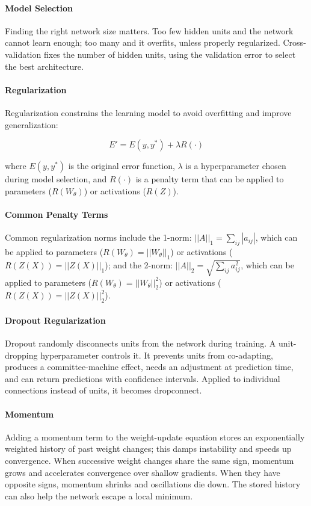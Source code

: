 \paragraph{Model Selection}
Finding the right network size matters. Too few hidden units and the network cannot learn enough; too many and it overfits, unless properly regularized. Cross-validation fixes the number of hidden units, using the validation error to select the best architecture.

\paragraph{Regularization}

Regularization constrains the learning model to avoid overfitting and improve generalization:

\begin{equation}
E' = E(y, y^*) + \lambda R(\cdot)
\end{equation}

where $E(y, y^*)$ is the original error function, $\lambda$ is a hyperparameter chosen during model selection, and $R(\cdot)$ is a penalty term that can be applied to parameters ($R(W_\theta)$) or activations ($R(Z)$).

\paragraph{Common Penalty Terms}

Common regularization norms include the 1-norm: $||A||_1 = \sum_{ij} |a_{ij}|$, which can be applied to parameters ($R(W_\theta) = ||W_\theta||_1$) or activations ($R(Z(X)) = ||Z(X)||_1$); and the 2-norm: $||A||_2 = \sqrt{\sum_{ij} a_{ij}^2}$, which can be applied to parameters ($R(W_\theta) = ||W_\theta||_2^2$) or activations ($R(Z(X)) = ||Z(X)||_2^2$).

\paragraph{Dropout Regularization} Dropout randomly disconnects units from the network during training. A unit-dropping hyperparameter controls it. It prevents units from co-adapting, produces a committee-machine effect, needs an adjustment at prediction time, and can return predictions with confidence intervals. Applied to individual connections instead of units, it becomes dropconnect.

\paragraph{Momentum} Adding a momentum term to the weight-update equation stores an exponentially weighted history of past weight changes; this damps instability and speeds up convergence. When successive weight changes share the same sign, momentum grows and accelerates convergence over shallow gradients. When they have opposite signs, momentum shrinks and oscillations die down. The stored history can also help the network escape a local minimum.

